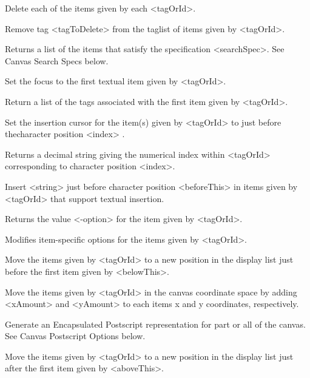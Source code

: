 \begin{enum}{1cm}
Delete each of the items given by each <tagOrId>.

Remove tag <tagToDelete> from the taglist of items given by <tagOrId>.

Returns a list of the items  that  satisfy the specification <searchSpec>.
See Canvas Search Specs below.

Set the focus to the first textual item given by <tagOrId>.

Return a list of the tags associated with the first item given by <tagOrId>.

Set the insertion cursor for the item(s) given by <tagOrId> to just 
before thecharacter  position <index> .

Returns a decimal  string  giving  the numerical  index  within  <tagOrId>
corresponding to character position <index>.

Insert <string> just before character position <beforeThis> in items
given by <tagOrId> that support textual insertion.

Returns the value <-option> for the item given by <tagOrId>.

Modifies  item-specific options for the items given by <tagOrId>.

Move the items given by <tagOrId> to a new position in the
display list just before the first item given by <belowThis>.

Move the items given by <tagOrId> in the canvas coordinate space by
adding <xAmount> and <yAmount> to each items x and y coordinates, respectively.

Generate an Encapsulated Postscript representation  for  part  or all  of  the canvas.
See Canvas Postscript Options below.

Move the items given by <tagOrId> to a new position in the
display list just after the first item given by <aboveThis>.


\end{enum}
